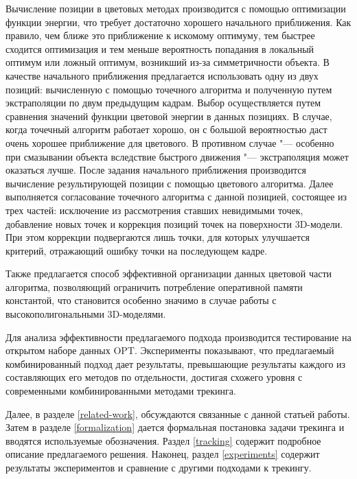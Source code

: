 Вычисление позиции в цветовых методах производится с помощью оптимизации
функции энергии, что требует достаточно хорошего начального приближения.
Как правило, чем ближе это приближение к искомому оптимуму, тем быстрее
сходится оптимизация и тем меньше вероятность попадания в локальный оптимум или
ложный оптимум, возникший из-за симметричности объекта.
В качестве начального приближения предлагается использовать одну из двух
позиций: вычисленную с помощью точечного алгоритма и полученную путем
экстраполяции по двум предыдущим кадрам.
Выбор осуществляется путем сравнения значений функции цветовой энергии в данных
позициях.
В случае, когда точечный алгоритм работает хорошо, он с большой вероятностью
даст очень хорошее приближение для цветового.
В противном случае "--- особенно при смазывании объекта вследствие
быстрого движения "--- экстраполяция может оказаться лучше.
После задания начального приближения производится вычисление результирующей
позиции с помощью цветового алгоритма.
Далее выполняется согласование точечного алгоритма с данной позицией, состоящее
из трех частей: исключение из рассмотрения ставших невидимыми точек,
добавление новых точек и коррекция позиций точек на поверхности 3D-модели.
При этом коррекции подвергаются лишь точки, для которых улучшается
критерий, отражающий ошибку точки на последующем кадре.

Также предлагается способ эффективной организации данных цветовой части
алгоритма, позволяющий ограничить потребление оперативной памяти константой,
что становится особенно значимо в случае работы с высокополигональными
3D-моделями.

Для анализа эффективности предлагаемого подхода производится тестирование
на открытом наборе данных OPT\cite{OPT}.
Эксперименты показывают, что предлагаемый комбинированный подход дает
результаты, превышающие результаты каждого из составляющих его методов по
отдельности, достигая схожего уровня с современными комбинированными методами трекинга.

Далее, в разделе \ref{related-work}, обсуждаются связанные с данной статьей
работы.
Затем в разделе \ref{formalization} дается формальная постановка задачи
трекинга и вводятся используемые обозначения.
Раздел \ref{tracking} содержит подробное описание предлагаемого решения.
Наконец, раздел \ref{experiments} содержит результаты экспериментов и сравнение
с другими подходами к трекингу.
